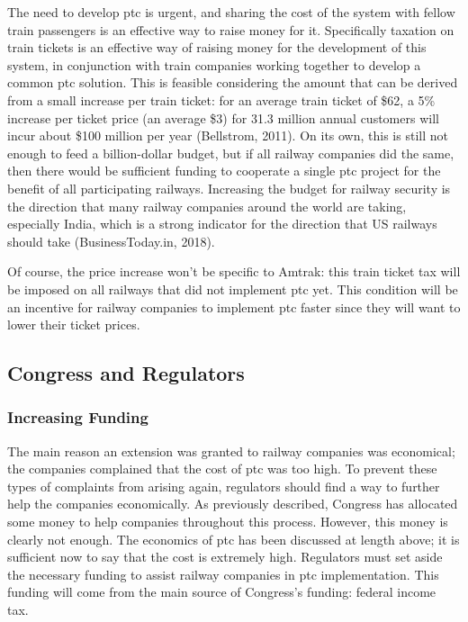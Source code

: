 \documentclass[11pt, titlepage]{article}
\begin{document}
The need to develop \gls{ptc} is urgent, and sharing the cost of the system with
fellow train passengers is an effective way to raise money for it. Specifically
taxation on train tickets is an effective way of raising money for the development
of this system, in conjunction with train companies working together to develop a
common \gls{ptc} solution. This is feasible considering the amount that can be
derived from a small increase per train ticket: for an average train ticket of \$62,
a 5\% increase per ticket price (an average \$3) for 31.3 million annual customers
will incur about \$100 million per year (Bellstrom, 2011). On its own, this is still
not enough to feed a billion-dollar budget, but if all railway companies did the
same, then there would be sufficient funding to cooperate a single \gls{ptc} project
for the benefit of all participating railways. Increasing the budget for railway
security is the direction that many railway companies around the world are taking,
especially India, which is a strong indicator for the direction that US railways
should take (BusinessToday.in, 2018).

Of course, the price increase won’t be specific to Amtrak: this train ticket tax
will be imposed on all railways that did not implement \gls{ptc} yet. This condition
will be an incentive for railway companies to implement \gls{ptc} faster since they
will want to lower their ticket prices.

\subsection{Congress and Regulators}

\subsubsection{Increasing Funding}

The main reason an extension was granted to railway companies was economical; the
companies complained that the cost of \gls{ptc} was too high. To prevent these types
of complaints from arising again, regulators should find a way to further help the
companies economically. As previously described, Congress has allocated some money
to help companies throughout this process. However, this money is clearly not
enough. The economics of \gls{ptc} has been discussed at length above; it is
sufficient now to say that the cost is extremely high. Regulators must set aside the
necessary funding to assist railway companies in \gls{ptc} implementation. This
funding will come from the main source of Congress’s funding: federal income tax.
\end{document}
